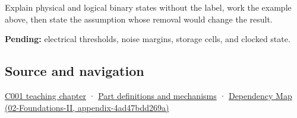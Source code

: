 Explain physical and logical binary states without the label, work the example above, then state the assumption whose removal would change the result.

\textbf{Pending:} electrical thresholds, noise margins, storage cells, and clocked state.

\subsection{Source and navigation}\label{source-and-navigation}

\href{Continuous\%20Notes/Computing\%20Foundations\%20-\%20From\%20Bits\%20to\%20C++\%20and\%20Systems\%20APIs\#From\%20a\%20signal\%20to\%20an\%20interpretation}{C001 teaching chapter} · \hyperref[appendix-fd090d982a15]{Part definitions and mechanisms} · \href{}{Dependency Map (02-Foundations-II, appendix-4ad47bdd269a)}
